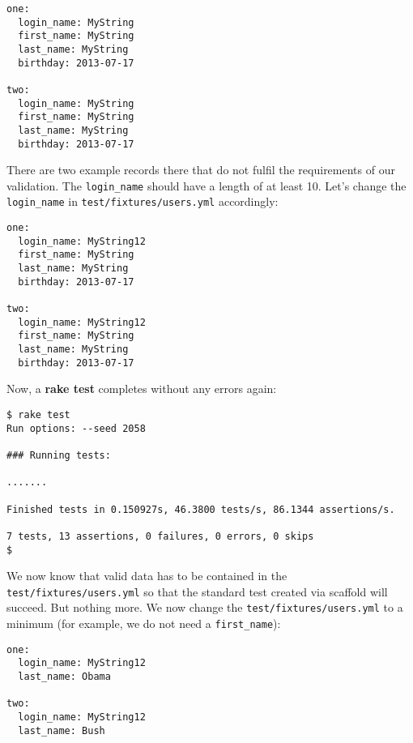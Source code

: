 \documentclass[a4paper]{book}
\begin{document}
\begin{shaded}\begin{verbatim}
one:
  login_name: MyString
  first_name: MyString
  last_name: MyString
  birthday: 2013-07-17

two:
  login_name: MyString
  first_name: MyString
  last_name: MyString
  birthday: 2013-07-17
\end{verbatim}\end{shaded}

There are two example records there that do not fulfil the requirements of our validation. The \texttt{login\_name} should have a length of at least 10. Let's change the \texttt{login\_name} in \texttt{test/fixtures/users.yml} accordingly:

\begin{shaded}\begin{verbatim}
one:
  login_name: MyString12
  first_name: MyString
  last_name: MyString
  birthday: 2013-07-17

two:
  login_name: MyString12
  first_name: MyString
  last_name: MyString
  birthday: 2013-07-17
\end{verbatim}\end{shaded}

Now, a \textbf{rake test} completes without any errors again:

\begin{shaded}\begin{verbatim}
$ rake test
Run options: --seed 2058

### Running tests:

.......

Finished tests in 0.150927s, 46.3800 tests/s, 86.1344 assertions/s.

7 tests, 13 assertions, 0 failures, 0 errors, 0 skips
$
\end{verbatim}\end{shaded}

We now know that valid data has to be contained in the \texttt{test/fixtures/users.yml} so that the standard test created via scaffold will succeed. But nothing more. We now change the \texttt{test/fixtures/users.yml} to a minimum (for example, we do not need a \texttt{first\_name}):

\begin{shaded}\begin{verbatim}
one:
  login_name: MyString12
  last_name: Obama

two:
  login_name: MyString12
  last_name: Bush
\end{verbatim}\end{shaded}
\end{document}
